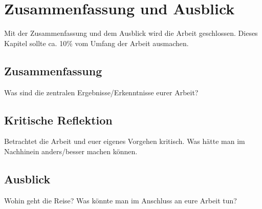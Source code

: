 \section{Zusammenfassung und Ausblick}
Mit der Zusammenfassung und dem Ausblick wird die Arbeit geschlossen. Dieses Kapitel sollte ca. 10\% vom Umfang der Arbeit ausmachen. 
\subsection{Zusammenfassung}
Was sind die zentralen Ergebnisse/Erkenntnisse eurer Arbeit?
\subsection{Kritische Reflektion} 
Betrachtet die Arbeit und euer eigenes Vorgehen kritisch. Was hätte man im Nachhinein anders/besser machen können.
\subsection{Ausblick}
Wohin geht die Reise? Was könnte man im Anschluss an eure Arbeit tun?